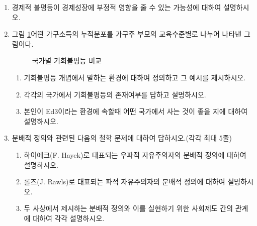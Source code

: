 \documentclass{article}
\begin{document}
\begin{enumerate}[{\bf 문제 \arabic*.}]
    \item 경제적 불평등이 경제성장에 부정적 영향을 줄 수 있는 가능성에 대하여 설명하시오.
    \item 그림 \ref{fig}\는 어떤 가구소득의 누적분포를 가구주 부모의 교육수준별로 나누어 나타낸 그림이다.
        \begin{figure}
            \centering
            \qquad
            \caption{국가별 기회불평등 비교}%
            \label{fig}
        \end{figure}
        \begin{enumerate}
            \item 기회불평등 개념에서 말하는 환경에 대하여 정의하고 그 예시를 제시하시오.
            \item 각각의 국가에서 기회불평등의 존재여부를 답하고 설명하시오. 
            \item 본인이 Ed3이라는 환경에 속할때 어떤 국가에서 사는 것이 좋을 지에 대하여 설명하시오.
        \end{enumerate}
    \item 분배적 정의와 관련된 다음의 철학 문제에 대하여 답하시오.(각각 최대 5줄)
        \begin{enumerate}
        \item 하이에크(F. Hayek)로 대표되는 우파적 자유주의자의 분배적 정의에 대하여 설명하시오.
        \item 롤즈(J. Rawls)로 대표되는 파적 자유주의자의 분배적 정의에 대하여 설명하시오.
        \item 두 사상에서 제시하는 분배적 정의와 이를 실현하기 위한 사회제도 간의 관계에 대하여 각각 설명하시오.

\end{enumerate}
\end{enumerate}
\end{document}
